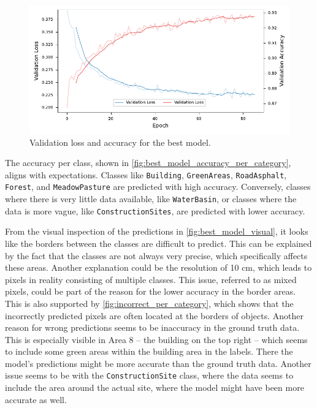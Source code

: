 \begin{figure}[H]
    \centering
    \captionsetup{width=0.8\linewidth}
    \includegraphics{figures/best_model_training_metrics.pdf}
    \caption{Validation loss and accuracy for the best model.}
    \label{fig:best_model_training_metrics}
\end{figure}

The accuracy per class, shown in \autoref{fig:best_model_accuracy_per_category},
aligns with expectations. Classes like \texttt{Building}, \texttt{GreenAreas}, \texttt{RoadAsphalt}, \texttt{Forest},
and \texttt{MeadowPasture} are predicted with high accuracy. Conversely, classes where there is
very little data available, like \texttt{WaterBasin}, or classes where the data is more vague,
like \texttt{ConstructionSites}, are predicted with lower accuracy.

From the visual inspection of the predictions in \autoref{fig:best_model_visual},  
it looks like the borders between the classes are difficult to predict. This can be  
explained by the fact that the classes are not always very precise, which specifically  
affects these areas. Another explanation could be the resolution of 10 cm,  
which leads to pixels in reality consisting of multiple classes. This issue, referred to  
as mixed pixels, could be part of the reason for the lower accuracy in the  
border areas. This is also supported by \autoref{fig:incorrect_per_category},  
which shows that the incorrectly predicted pixels are often located at the borders  
of objects. Another reason for wrong predictions seems to be inaccuracy in the  
ground truth data. This is especially visible in Area 8 -- the building on the  
top right -- which seems to include some green areas within the building area in the labels.  
There the model’s predictions might be more accurate than the ground truth data.  
Another issue seems to be with the \texttt{ConstructionSite} class, where the  
data seems to include the area around the actual site, where the model might have been  
more accurate as well.


